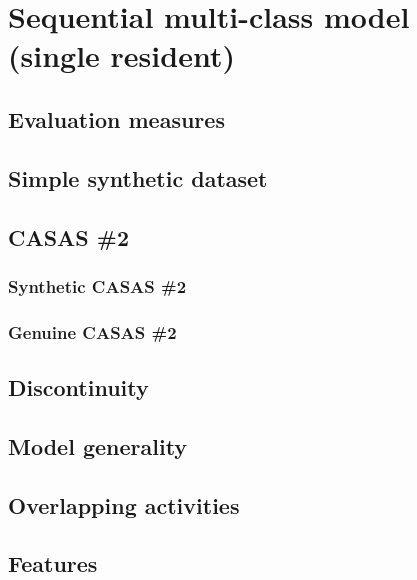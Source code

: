 \documentclass[12pt, a4paper, pdflatex, leqno, twoside, openright]{report}
\begin{document}
\chapter{Sequential multi-class model\\(single resident)\label{ch:smcm}}
  \section{Evaluation measures}
  \section{Simple synthetic dataset}
  \section{CASAS \#2}
    \subsection{Synthetic CASAS \#2}
    \subsection{Genuine CASAS \#2}
  \section{Discontinuity}
  \section{Model generality}
  \section{Overlapping activities}
  \section{Features\label{sec:single:features}}
\end{document}
